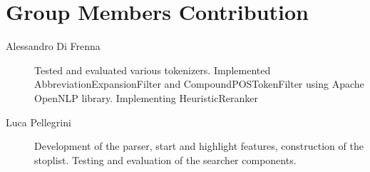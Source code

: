 \section{Group Members Contribution}


\begin{description}
	\item[Alessandro Di Frenna] Tested and evaluated various tokenizers. Implemented AbbreviationExpansionFilter and CompoundPOSTokenFilter using Apache OpenNLP library. Implementing HeuristicReranker
	\item[Luca Pellegrini] Development of the parser, start and highlight features, construction of the stoplist. Testing and evaluation of the searcher components.
\end{description}
